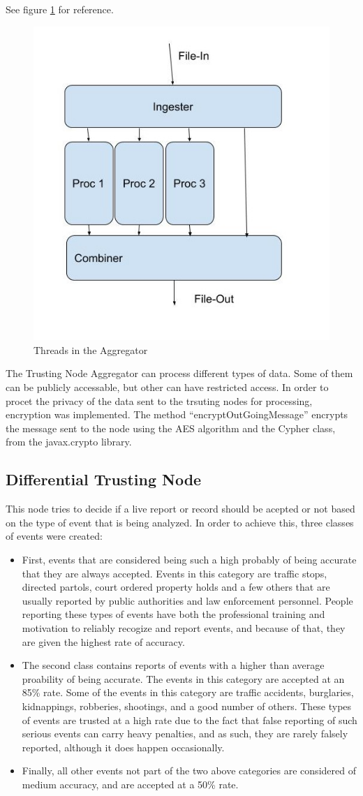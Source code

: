 \documentclass[11pt]{article}
\begin{document}
See figure \ref{agg} for reference.

\begin{figure}
  \centering
  \includegraphics[width=.5\textwidth]{pics/Aggregator.jpg}
  \caption{Threads in the Aggregator}
  \label{agg}
\end{figure}

The Trusting Node Aggregator can process different types of data. Some of them can be publicly accessable, but other can have restricted access. In order to procet the privacy of the data sent to the trsuting nodes for processing, encryption was implemented. The method ``encryptOutGoingMessage'' encrypts the message sent to the node using the AES algorithm and the Cypher class, from the javax.crypto library.

\subsection{Differential Trusting Node}

This node tries to decide if a live report or record should be acepted or not based on the type of event that is being analyzed. In order to achieve this, three classes of events were created:

\begin{itemize}
\item First, events that are considered being such a high probably of being accurate that they are always accepted. Events in this category are traffic stops, directed partols, court ordered property holds and a few others that are usually reported by public authorities and law enforcement personnel. People reporting these types of events have both the professional training and motivation to reliably recogize and report events, and because of that, they are given the highest rate of accuracy.
\item The second class contains reports of events with a higher than average proability of being accurate. The events in this category are accepted at an 85\% rate. Some of the events in this category are traffic accidents, burglaries, kidnappings, robberies, shootings, and a good number of others. These types of events are trusted at a high rate due to the fact that false reporting of such serious events can carry heavy penalties, and as such, they are rarely falsely reported, although it does happen occasionally.
\item Finally, all other events not part of the two above categories are considered of medium accuracy, and are accepted at a 50\% rate.
\end{itemize}
\end{document}
